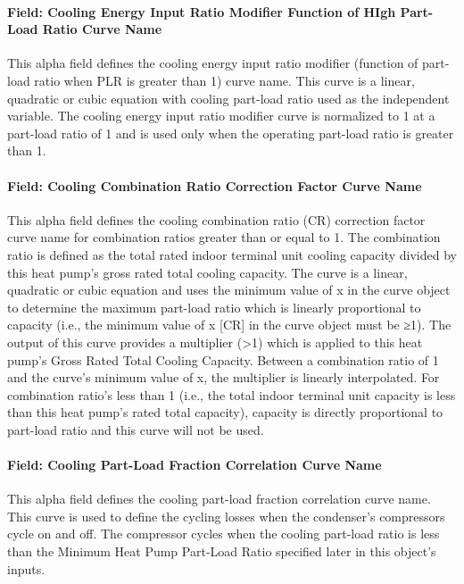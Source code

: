 \paragraph{Field: Cooling Energy Input Ratio Modifier Function of HIgh Part-Load Ratio Curve Name}\label{field-cooling-energy-input-ratio-modifier-function-of-high-part-load-ratio-curve-name}

This alpha field defines the cooling energy input ratio modifier (function of part-load ratio when PLR is greater than 1) curve name. This curve is a linear, quadratic or cubic equation with cooling part-load ratio used as the independent variable. The cooling energy input ratio modifier curve is normalized to 1 at a part-load ratio of 1 and is used only when the operating part-load ratio is greater than 1.

\paragraph{Field: Cooling Combination Ratio Correction Factor Curve Name}\label{field-cooling-combination-ratio-correction-factor-curve-name}

This alpha field defines the cooling combination ratio (CR) correction factor curve name for combination ratios greater than or equal to 1. The combination ratio is defined as the total rated indoor terminal unit cooling capacity divided by this heat pump's gross rated total cooling capacity. The curve is a linear, quadratic or cubic equation and uses the minimum value of x in the curve object to determine the maximum part-load ratio which is linearly proportional to capacity (i.e., the minimum value of x {[}CR{]} in the curve object must be ≥1). The output of this curve provides a multiplier (\textgreater{}1) which is applied to this heat pump's Gross Rated Total Cooling Capacity. Between a combination ratio of 1 and the curve's minimum value of x, the multiplier is linearly interpolated. For combination ratio's less than 1 (i.e., the total indoor terminal unit capacity is less than this heat pump's rated total capacity), capacity is directly proportional to part-load ratio and this curve will not be used.

\paragraph{Field: Cooling Part-Load Fraction Correlation Curve Name}\label{field-cooling-part-load-fraction-correlation-curve-name}

This alpha field defines the cooling part-load fraction correlation curve name. This curve is used to define the cycling losses when the condenser's compressors cycle on and off. The compressor cycles when the cooling part-load ratio is less than the Minimum Heat Pump Part-Load Ratio specified later in this object's inputs.

